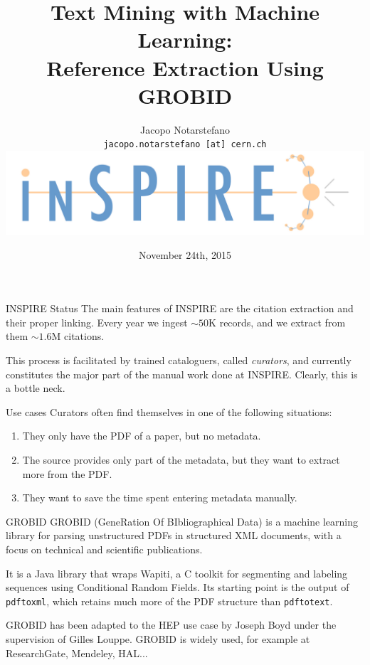 \documentclass[10pt]{beamer}
\title{
  Text Mining with Machine Learning:\\
  Reference Extraction Using GROBID
}
\author[Jacopo Notarstefano]{
  Jacopo Notarstefano\\
  \texttt{jacopo.notarstefano [at] cern.ch}\\
  \vspace{0.25cm}
  \includegraphics[scale=0.25]{tex/img/inspire}
}
\date{November 24th, 2015}
\newcommand{\cpp}{C\nolinebreak\hspace{-.05em}\raisebox{.4ex}{\tiny\bf +}\nolinebreak\hspace{-.10em}\raisebox{.4ex}{\tiny\bf +}}
\begin{document}
  \begin{frame}[plain]
    \titlepage
  \end{frame}

  \begin{frame}{INSPIRE Status}
    The main features of INSPIRE are the citation extraction and their proper linking.
    Every year we ingest $\sim50\text{K}$ records, and we extract from them $\sim1.6\text{M}$ citations.

    \vspace{0.5cm}

    This process is facilitated by trained cataloguers, called \emph{curators}, and currently
    constitutes the major part of the manual work done at INSPIRE. Clearly, this is a bottle neck.
  \end{frame}

  \begin{frame}{Use cases}
    Curators often find themselves in one of the following situations:

    \vspace{0.5cm}

    \begin{enumerate}
      \item They only have the PDF of a paper, but no metadata.
      \item The source provides only part of the metadata, but they want to extract more from the PDF.
      \item They want to save the time spent entering metadata manually.
    \end{enumerate}
  \end{frame}

  \begin{frame}{GROBID}
    GROBID (GeneRation Of BIbliographical Data) is a machine learning library for parsing
    unstructured PDFs in structured XML documents, with a focus on technical and scientific
    publications.

    \vspace{0.5cm}

    It is a Java library that wraps Wapiti, a \cpp\xspace toolkit for segmenting and
    labeling sequences using Conditional Random Fields. Its starting point is the output
    of \texttt{pdftoxml}, which retains much more of the PDF structure than \texttt{pdftotext}.

    \vspace{0.5cm}

    GROBID has been adapted to the HEP use case by Joseph Boyd under the supervision of Gilles
    Louppe. GROBID is widely used, for example at ResearchGate, Mendeley, HAL...
  \end{frame}
\end{document}
